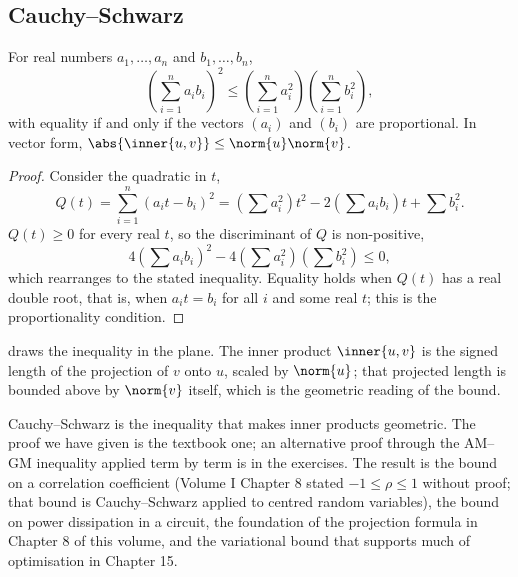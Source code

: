 \subsection{Cauchy--Schwarz}

For real numbers $a_{1}, \ldots, a_{n}$ and $b_{1}, \ldots, b_{n}$,
\[
\left(\sum_{i=1}^{n} a_{i} b_{i}\right)^{2}
\leq \left(\sum_{i=1}^{n} a_{i}^{2}\right)
\left(\sum_{i=1}^{n} b_{i}^{2}\right),
\]
with equality if and only if the vectors $(a_{i})$ and $(b_{i})$ are
proportional. In vector form, $\abs{\inner{u, v}} \leq \norm{u}
\norm{v}$.

\begin{proof}
Consider the quadratic in $t$,
\[
Q(t) = \sum_{i=1}^{n} (a_{i} t - b_{i})^{2}
= \left(\sum a_{i}^{2}\right) t^{2}
- 2 \left(\sum a_{i} b_{i}\right) t
+ \sum b_{i}^{2}.
\]
$Q(t) \geq 0$ for every real $t$, so the discriminant of $Q$ is
non-positive,
\[
4 \left(\sum a_{i} b_{i}\right)^{2}
- 4 \left(\sum a_{i}^{2}\right) \left(\sum b_{i}^{2}\right) \leq 0,
\]
which rearranges to the stated inequality. Equality holds when
$Q(t)$ has a real double root, that is, when $a_{i} t = b_{i}$ for
all $i$ and some real $t$; this is the proportionality condition.
\end{proof}



 draws the inequality in the
plane. The inner product $\inner{u, v}$ is the signed length of the
projection of $v$ onto $u$, scaled by $\norm{u}$; that projected
length is bounded above by $\norm{v}$ itself, which is the geometric
reading of the bound.

Cauchy--Schwarz is the inequality that makes inner products geometric.
The proof we have given is the textbook one; an alternative proof
through the AM--GM inequality applied term by term is in the
exercises. The result is the bound on a correlation coefficient
(Volume I Chapter 8 stated $-1 \leq \rho \leq 1$ without proof; that
bound is Cauchy--Schwarz applied to centred random variables), the
bound on power dissipation in a circuit, the foundation of the
projection formula in Chapter 8 of this volume, and the variational
bound that supports much of optimisation in Chapter 15.

